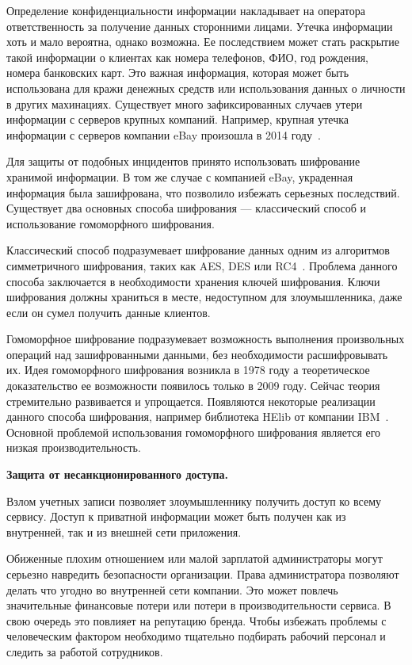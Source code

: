 Определение конфиденциальности информации накладывает на оператора ответственность за получение данных сторонними лицами. Утечка информации хоть и мало вероятна, однако возможна. Ее последствием может стать раскрытие такой информации о клиентах как номера телефонов, ФИО, год рождения, номера банковских карт. Это важная информация, которая может быть использована для кражи денежных средств или использования данных о личности в других махинациях. Существует много зафиксированных случаев утери информации с серверов крупных компаний. Например, крупная утечка информации с серверов компании eBay произошла в 2014 году~\cite{eBayPass}.

Для защиты от подобных инцидентов принято использовать шифрование хранимой информации. В том же случае с компанией eBay, украденная информация была зашифрована, что позволило избежать серьезных последствий. Существует два основных способа шифрования --- классический способ и использование гомоморфного шифрования. 

Классический способ подразумевает шифрование данных одним из алгоритмов симметричного шифрования, таких как AES, DES или RC4~\cite{sqlSecurity}. Проблема данного способа заключается в необходимости хранения ключей шифрования. Ключи шифрования должны храниться в месте, недоступном для злоумышленника, даже если он сумел получить данные клиентов.

Гомоморфное шифрование подразумевает возможность выполнения произвольных операций над зашифрованными данными, без необходимости расшифровывать их. Идея гомоморфного шифрования возникла в 1978 году а теоретическое доказательство ее возможности появилось только в 2009 году. Сейчас теория стремительно развивается и упрощается. Появляются некоторые реализации данного способа шифрования, например библиотека HElib от компании IBM~\cite{HElib}. Основной проблемой использования гомоморфного шифрования является его низкая производительность.

\textbf{Защита от несанкционированного доступа.}

Взлом учетных записи позволяет злоумышленнику получить доступ ко всему сервису. Доступ к приватной информации может быть получен как из внутренней, так и из внешней сети приложения. 

Обиженные плохим отношением или малой зарплатой администраторы могут серьезно навредить безопасности организации. Права администратора позволяют делать что угодно во внутренней сети компании. Это может повлечь значительные финансовые потери или потери в производительности сервиса. В свою очередь это повлияет на репутацию бренда. Чтобы избежать проблемы с человеческим фактором необходимо тщательно подбирать рабочий персонал и следить за работой сотрудников.

